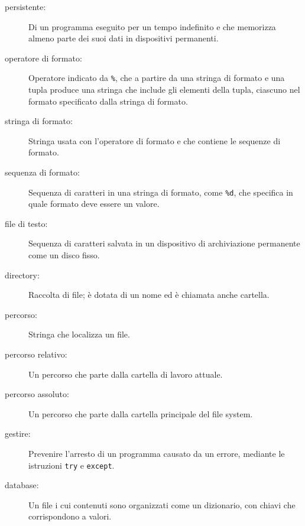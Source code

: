 \documentclass[10pt]{book}
\begin{document}
\begin{description}

\item[persistente:] Di un programma eseguito per un tempo indefinito e che memorizza almeno parte dei suoi dati in dispositivi permanenti.

\item[operatore di formato:] Operatore indicato da {\tt \%}, che a partire da una stringa di formato e una tupla produce una stringa che include gli elementi della tupla, ciascuno nel formato specificato dalla stringa di formato.

\item[stringa di formato:] Stringa usata con l'operatore di formato e che contiene le sequenze di formato.  

\item[sequenza di formato:] Sequenza di caratteri in una stringa di formato, come {\tt \%d}, che specifica in quale formato deve essere un valore.

\item[file di testo:] Sequenza di caratteri salvata in un dispositivo di archiviazione permanente come un disco fisso.

\item[directory:] Raccolta di file; è dotata di un nome ed è chiamata anche cartella.

\item[percorso:] Stringa che localizza un file.

\item[percorso relativo:] Un percorso che parte dalla cartella di lavoro attuale.

\item[percorso assoluto:] Un percorso che parte dalla cartella principale del file system.

\item[gestire:] Prevenire l'arresto di un programma causato da un errore, mediante le istruzioni {\tt try}
e {\tt except}.

\item[database:] Un file i cui contenuti sono organizzati come un dizionario, con chiavi che corrispondono a valori.

\end{description}
\end{document}
